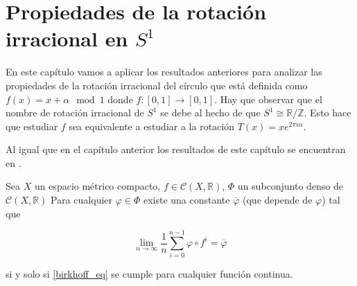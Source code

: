 \chapter{Propiedades de la rotación irracional en $S^1$}

En este capítulo vamos a aplicar los resultados anteriores para analizar las propiedades de la rotación irracional del círculo que está definida como $f(x) = x + \alpha \mod 1$ donde $f: [0,1] \rightarrow [0,1]$. Hay que observar que el nombre de rotación irracional de $S^1$ se debe al hecho de que $S^1 \cong \mathbb{R}/\mathbb{Z}$. Esto hace que estudiar $f$ sea equivalente a estudiar a la rotación $T(x) = x e^{2\pi i \alpha}$.

Al igual que en el capítulo anterior los resultados de este capítulo se encuentran en \cite{youtube}.

\begin{lema}\label{lema_varphi_m}
	Sea $X$ un espacio métrico compacto, $f \in \mathcal{C}(X,\mathbb{R})$, $\Phi$ un subconjunto denso de $\mathcal{C}(X, \mathbb{R})$ Para cualquier $\varphi \in \Phi$ existe una constante $\overline{\varphi}$ (que depende de $\varphi$) tal que
	
	\begin{equation}\label{birkhoff_eq}
		\lim_{n \rightarrow \infty} \frac{1}{n} \sum_{i=0}^{n-1} \varphi \circ f^i = \overline{\varphi}
	\end{equation}
	
	si y solo si \eqref{birkhoff_eq} se cumple para cualquier función continua.
\end{lema}

